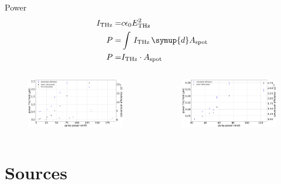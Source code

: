 \documentclass[aspectratio=1610, 9pt]{beamer}
\begin{document}
\begin{frame}{Power}
  \begin{align}
    I_\text{THz} =& c \epsilon_0 E_\text{THz}^2 \\
    P =& \int\, I_\text{THz} \,\symup{d}A_\text{spot}\\
    P =& I_\text{THz}\cdot A_\text{spot}
\end{align}
  \begin{columns}
    \begin{column}{.5\textwidth}
  \begin{figure}
    \includegraphics[width=\textwidth]{images/Powerznte.pdf}
  \end{figure}
  \end{column}
  \begin{column}{.5\textwidth}
    \begin{figure}
      \includegraphics[width=\textwidth]{images/Powergap.pdf}
    \end{figure}    
  \end{column}
  \end{columns}
\end{frame}

\section{Sources}
\printbibliography
\end{document}
